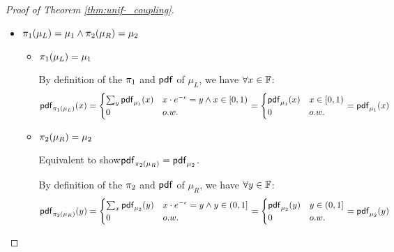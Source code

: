 \documentclass[a4paper,11pt]{article}
\begin{document}
\begin{proof}[Proof of Theorem \ref{thm:unif-_coupling}]
\begin{itemize}
\begin{itemize}
		\\  
		Then we know $\supp(\mu_L) \subseteq R'$.
		Since $R' \subseteq R$, 
		we can then derive $\supp(\mu_L) \subseteq R$.
		\item $\supp(\mu_R) \subseteq R$
		\\
		By definition of the $\pdf$ of $\mu_R$, 
		$\supp(\mu_R) = \{(x, y) ~\vert~ \pdf_{\mu_R}(x, y) > 0\}$,
		we have: 
		\\
		$\supp(\mu_R) = \{(x, y) ~\vert~ 
		x = y \cdot e^{-\epsilon} \land y \in (0, 1]\}$
		\\  
		Then we know $\supp(\mu_R) \subseteq R'$. 
		Since $R' \subseteq R$, 
		we can then derive $\supp(\mu_R) \subseteq R$.
	\end{itemize}		
%
	\item $\pi_1(\mu_L) = \mu_1 \land \pi_2(\mu_R) = \mu_2$
	
	\begin{itemize}
		\item $\pi_1(\mu_L) = \mu_1$ 


		By definition of the $\pi_1$ and $\pdf$ of $\mu_L$, we have $\forall x  \in \mathbb{F}$:
		\[
			\mathsf{pdf}_{\pi_1(\mu_L)}(x) = 
			\begin{cases}
			\sum_{y}\mathsf{pdf}_{\mu_1}(x) 
			& x \cdot e^{-\epsilon}  = y 
			\land x \in [0, 1)\\
			0       & o.w.
			\end{cases} 
			= 
			\begin{cases}
			\mathsf{pdf}_{\mu_1}(x) & x \in [0, 1)\\
			0       & o.w.
			\end{cases}
			=
			\mathsf{pdf}_{\mu_1}(x)
		\]

		\item $\pi_2(\mu_R) = \mu_2$ 

		Equivalent to show$\mathsf{pdf}_{\pi_2(\mu_R)}  = \mathsf{pdf}_{\mu_2}$.

		By definition of the $\pi_2$ and $\pdf$ of $\mu_R$, we have $\forall y \in \mathbb{F}$:
		\[
			\mathsf{pdf}_{\pi_2(\mu_R)}(y) = 
			\begin{cases}
			\sum_{x}\mathsf{pdf}_{\mu_2}(y) 
			& x \cdot e^{-\epsilon} = y 
			\land y \in (0, 1]\\
			0       & o.w.
			\end{cases} 
			= 
			\begin{cases}
			\mathsf{pdf}_{\mu_2}(y) & y \in (0, 1]\\
			0       & o.w.
			\end{cases}
			=
			\mathsf{pdf}_{\mu_2}(y)
		\]
	\end{itemize}	


\end{itemize}
\end{proof}
\end{document}
